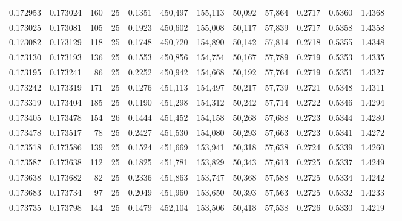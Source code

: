 \begin{tabular}{rrrrrrrrrrrrr}
0.172953 & 0.173024 &   160 &  25 &                                     0.1351 & 450,497 & 155,113 &  50,092 &  57,864 & 0.2717 & 0.5360 & 1.4368 \\
0.173025 & 0.173081 &   105 &  25 &                                     0.1923 & 450,602 & 155,008 &  50,117 &  57,839 & 0.2717 & 0.5358 & 1.4358 \\
0.173082 & 0.173129 &   118 &  25 &                                     0.1748 & 450,720 & 154,890 &  50,142 &  57,814 & 0.2718 & 0.5355 & 1.4348 \\
0.173130 & 0.173193 &   136 &  25 &                                     0.1553 & 450,856 & 154,754 &  50,167 &  57,789 & 0.2719 & 0.5353 & 1.4335 \\
0.173195 & 0.173241 &    86 &  25 &                                     0.2252 & 450,942 & 154,668 &  50,192 &  57,764 & 0.2719 & 0.5351 & 1.4327 \\
0.173242 & 0.173319 &   171 &  25 &                                     0.1276 & 451,113 & 154,497 &  50,217 &  57,739 & 0.2721 & 0.5348 & 1.4311 \\
0.173319 & 0.173404 &   185 &  25 &                                     0.1190 & 451,298 & 154,312 &  50,242 &  57,714 & 0.2722 & 0.5346 & 1.4294 \\
0.173405 & 0.173478 &   154 &  26 &                                     0.1444 & 451,452 & 154,158 &  50,268 &  57,688 & 0.2723 & 0.5344 & 1.4280 \\
0.173478 & 0.173517 &    78 &  25 &                                     0.2427 & 451,530 & 154,080 &  50,293 &  57,663 & 0.2723 & 0.5341 & 1.4272 \\
0.173518 & 0.173586 &   139 &  25 &                                     0.1524 & 451,669 & 153,941 &  50,318 &  57,638 & 0.2724 & 0.5339 & 1.4260 \\
0.173587 & 0.173638 &   112 &  25 &                                     0.1825 & 451,781 & 153,829 &  50,343 &  57,613 & 0.2725 & 0.5337 & 1.4249 \\
0.173638 & 0.173682 &    82 &  25 &                                     0.2336 & 451,863 & 153,747 &  50,368 &  57,588 & 0.2725 & 0.5334 & 1.4242 \\
0.173683 & 0.173734 &    97 &  25 &                                     0.2049 & 451,960 & 153,650 &  50,393 &  57,563 & 0.2725 & 0.5332 & 1.4233 \\
0.173735 & 0.173798 &   144 &  25 &                                     0.1479 & 452,104 & 153,506 &  50,418 &  57,538 & 0.2726 & 0.5330 & 1.4219 \\

\end{tabular}
